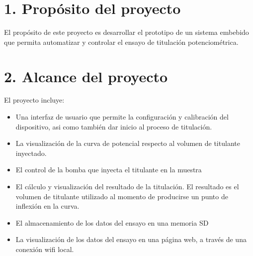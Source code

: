 \documentclass[11pt]{charter}
\begin{document}
 

\section{1. Propósito del proyecto}
\label{sec:proposito}


El propósito de este proyecto es desarrollar el prototipo de un sistema embebido que permita automatizar y controlar el ensayo de titulación potenciométrica.


\section{2. Alcance del proyecto}
\label{sec:alcance}

El proyecto incluye:
\begin{itemize}
\item Una interfaz de usuario que permite la configuración y calibración del dispositivo, asi como también dar inicio al proceso de titulación.
\item La visualización de la curva de potencial respecto al volumen de titulante inyectado.
\item El control de la bomba que inyecta el titulante en la muestra
\item El cálculo y visualización del resultado de la titulación. El resultado es el volumen de titulante utilizado al momento de producirse un punto de inflexión en la curva.
\item El almacenamiento de los datos del ensayo en una memoria SD
\item La visualización de los datos del ensayo en una página web, a través de una conexión wifi local.
\end{itemize}
\end{document}

